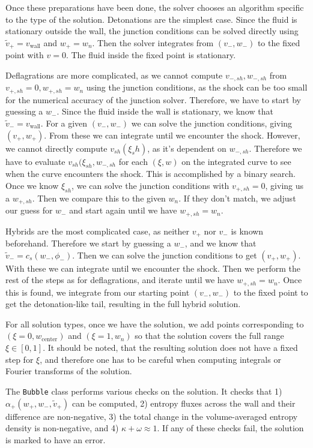 Once these preparations have been done,
the solver chooses an algorithm specific to the type of the solution.
Detonations are the simplest case.
Since the fluid is stationary outside the wall,
the junction conditions can be solved directly using
$\tilde{v}_+ = v_\text{wall}$ and $w_+ = w_n$.
Then the solver integrates from $(v_-, w_-)$ to the fixed point with $v=0$.
The fluid inside the fixed point is stationary.

Deflagrations are more complicated,
as we cannot compute $v_{-,sh}, w_{-,sh}$ from $v_{+,sh}=0, w_{+,sh}=w_n$ using the junction conditions,
as the shock can be too small for the numerical accuracy of the junction solver.
Therefore, we have to start by guessing a $w_-$.
Since the fluid inside the wall is stationary, we know that $\tilde{v}_- = v_{\text{wall}}$.
For a given $(v_-, w_-)$ we can solve the junction conditions, giving $(v_+, w_+)$.
From these we can integrate until we encounter the shock.
However, we cannot directly compute $v_{sh}(\xi_sh)$, as it's dependent on $w_{-,sh}$.
Therefore we have to evaluate $v_{sh}(\xi_{sh}, w_{-,sh}$ for each $(\xi, w)$ on the integrated curve to see
when the curve encounters the shock.
This is accomplished by a binary search.
Once we know $\xi_{sh}$, we can solve the junction conditions with $v_{+,sh} = 0$, giving us a $w_{+,sh}$.
Then we compare this to the given $w_n$.
If they don't match, we adjust our guess for $w_-$ and start again until we have $w_{+,sh} = w_n$.

Hybrids are the most complicated case, as neither $v_+$ nor $v_-$ is known beforehand.
Therefore we start by guessing a $w_-$, and we know that $\tilde{v}_- = c_s(w_-, \phi_-)$.
Then we can solve the junction conditions to get $(v_+, w_+)$.
With these we can integrate until we encounter the shock.
Then we perform the rest of the steps as for deflagrations, and iterate until we have $w_{+,sh} = w_n$.
Once this is found, we integrate from our starting point $(v_-, w_-)$ to the fixed point to get the detonation-like tail,
resulting in the full hybrid solution.

For all solution types, once we have the solution,
we add points corresponding to $(\xi=0, w_\text{center})$ and $(\xi=1, w_n)$
so that the solution covers the full range $\xi \in [0, 1]$.
It should be noted, that the resulting solution does not have a fixed step for $\xi$,
and therefore one has to be careful when computing integrals or Fourier transforms of the solution.

The \verb|Bubble| class performs various checks on the solution.
It checks that
1) $\alpha_+(w_+, w_-, \tilde{v}_+)$ can be computed,
2) entropy fluxes across the wall and their difference are non-negative,
3) the total change in the volume-averaged entropy density is non-negative, and
4) $\kappa + \omega \approx 1$.
If any of these checks fail, the solution is marked to have an error.


